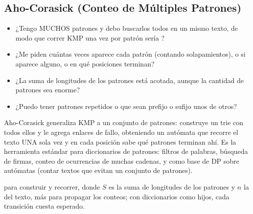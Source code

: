 \subsection{Aho-Corasick (Conteo de Múltiples Patrones)}
\label{alg:9-11}


\begin{itemize}
\item ¿Tengo MUCHOS patrones y debo buscarlos todos en un mismo texto, de modo que correr KMP una vez por patrón sería ?
\item ¿Me piden cuántas veces aparece cada patrón (contando solapamientos), o si aparece alguno, o en qué posiciones terminan?
\item ¿La suma de longitudes de los patrones está acotada, aunque la cantidad de patrones sea enorme?
\item ¿Puedo tener patrones repetidos o que sean prefijo o sufijo unos de otros?
\end{itemize}

 Aho-Corasick generaliza KMP a un conjunto de patrones: construye un trie con todos ellos y le agrega enlaces de fallo, obteniendo un autómata que recorre el texto UNA sola vez y en cada posición sabe qué patrones terminan ahí. Es la herramienta estándar para diccionarios de patrones: filtros de palabras, búsqueda de firmas, conteo de ocurrencias de muchas cadenas, y como base de DP sobre autómatas (contar textos que evitan un conjunto de patrones).

  para construir y recorrer, donde $S$ es la suma de longitudes de los patrones y $n$ la del texto, más  para propagar los conteos; con diccionarios como hijos, cada transición cuesta  esperado.


